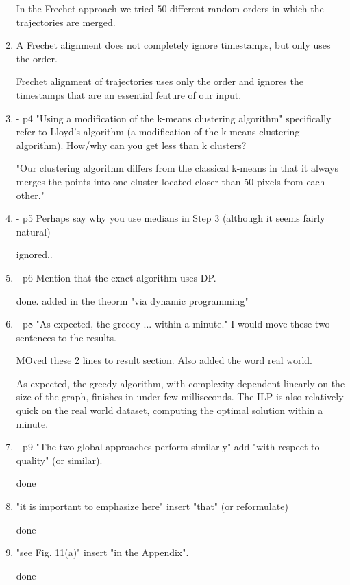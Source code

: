 \documentclass[12pt]{article}
\begin{document}
\begin{enumerate}
In the Frechet approach 
 we tried $50$  different random orders
in which the
trajectories are merged.

 \item {A Frechet alignment does not completely ignore timestamps, but only uses the order.}

Frechet alignment of trajectories uses only the order and
ignores the timestamps that are
an essential feature of our input.

 \item {- p4 "Using a modification of the k-means clustering algorithm" specifically refer to Lloyd's algorithm (a modification of the k-means clustering algorithm). How/why can you get less than k clusters?}

"Our clustering algorithm differs from the classical
k-means in that it always merges the points into one cluster located closer than 50
pixels from each other."

\item {- p5 Perhaps say why you use medians in Step 3 (although it seems fairly natural)}

ignored.. 

\item {- p6 Mention that the exact algorithm uses DP.}

 done. added in the theorm "via dynamic programming"

\item {- p8 "As expected, the greedy ... within a minute." I would move these two sentences to the results.}

MOved these 2 lines to result section. Also added the word real world.

As expected, the greedy algorithm, with complexity dependent
linearly on the size of the graph, finishes in under few milliseconds.
The ILP is also relatively quick on the real world dataset, computing the optimal solution within a minute.


\item - p9 "The two global approaches perform similarly" add "with respect to quality" (or similar).

done

 \item {"it is important to emphasize here" insert "that" (or reformulate)}

done
 \item {"see Fig. 11(a)" insert "in the Appendix".}

done





\end{enumerate}
\end{document}
